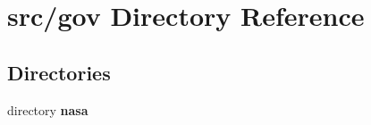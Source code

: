 \section{src/gov Directory Reference}
\label{dir_7d62d1059ec54d5dc63de032b83eaa8e}
\subsection*{Directories}
\begin{DoxyCompactItemize}
\item 
directory {\bf nasa}
\end{DoxyCompactItemize}
